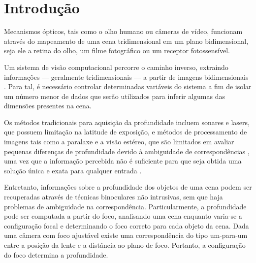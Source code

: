 \chapter{Introdu\c{c}\~ao}
Mecanismos \'opticos, tais como o olho humano ou c\^ameras de v\'ideo, funcionam atrav\'es do mapeamento de uma cena tridimensional em um plano bidimensional, seja ele a retina do olho, um filme fotogr\'afico ou um receptor fotossens\'ivel.

Um sistema de vis\~ao computacional percorre o caminho inverso, extraindo informa\c{c}\~oes --- geralmente tridimensionais --- a partir de imagens bidimensionais \cite{Gross87}. Para tal, \'e necess\'ario controlar determinadas vari\'aveis do sistema a fim de isolar um n\'umero menor de dados que ser\~ao utilizados para inferir algumas das dimens\~oes presentes na cena.

Os m\'etodos tradicionais para aquisi\c{c}\~ao da profundidade incluem sonares e lasers, que possuem limita\c{c}\~ao na latitude de exposi\c{c}\~ao, e m\'etodos de processamento de imagens tais como a paralaxe e a vis\~ao est\'ereo, que s\~ao limitados em avaliar pequenas diferen\c{c}as de profundidade devido \`a ambiguidade de correspond\^encias \cite{Darrell88}, uma vez que a informa\c{c}\~ao percebida n\~ao \'e suficiente para que seja obtida uma solu\c{c}\~ao \'unica e exata para qualquer entrada \cite{Oliveira06}.

Entretanto, informa\c{c}\~oes sobre a profundidade dos objetos de uma cena podem ser recuperadas atrav\'es de t\'ecnicas binoculares n\~ao intrusivas, sem que haja problemas de ambiguidade na correspond\^encia. Particularmente, a profundidade pode ser computada a partir do foco, analisando uma cena enquanto varia-se a configura\c{c}\~ao focal e determinando o foco correto para cada objeto da cena. Dada uma c\^amera com foco ajust\'avel existe uma correspond\^encia do tipo um-para-um entre a posi\c{c}\~ao da lente e a dist\^ancia ao plano de foco. Portanto, a configura\c{c}\~ao do foco determina a profundidade.